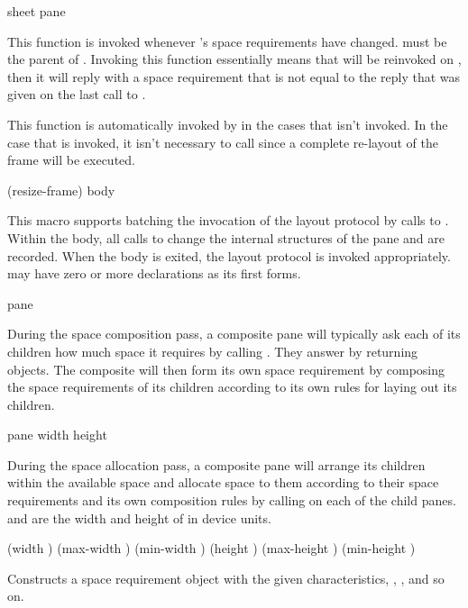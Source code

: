  {sheet pane}

This function is invoked whenever 's space requirements have changed.
 must be the parent of .  Invoking this function
essentially means that  will be reinvoked on , then
it will reply with a space requirement that is not equal to the reply that was
given on the last call to .

This function is automatically invoked by  in the
cases that  isn't invoked.  In the case that 
is invoked, it isn't necessary to call 
since a complete re-layout of the frame will be executed.

 {(\key resize-frame) \body body}

This macro supports batching the invocation of the layout protocol by calls
to .  Within the body, all calls to
 change the internal structures of the pane and
are recorded.  When the body is exited, the layout protocol is invoked
appropriately.   may have zero or more declarations as its first
forms.


 {pane}

During the space composition pass, a composite pane will typically ask each of
its children how much space it requires by calling .  They
answer by returning  objects.  The composite will then
form its own space requirement by composing the space requirements of its
children according to its own rules for laying out its children.

 {pane width height}

During the space allocation pass, a composite pane will arrange its children
within the available space and allocate space to them according to their space
requirements and its own composition rules by calling  on
each of the child panes.   and  are the width and height
of  in device units.


 {\key (width ) (max-width ) (min-width )
                                      (height ) (max-height ) (min-height )}

Constructs a space requirement object with the given characteristics, ,
, and so on.

